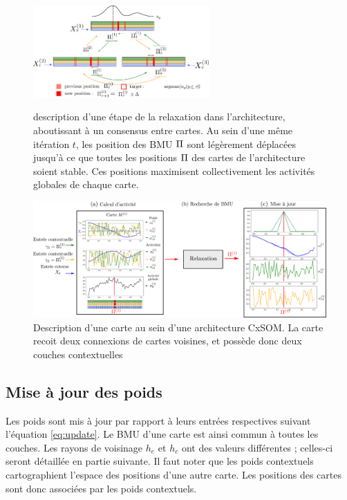 \begin{figure}
\centering
\includegraphics[width=0.6\textwidth]{relaxation.pdf}
\label{fig:relax}
\caption{description d'une étape de la relaxation dans l'architecture, aboutissant à un consensus entre cartes. Au sein d'une même itération $t$, les position des BMU $\Pi$ sont légèrement déplacées jusqu'à ce que toutes les positions $\Pi$ des cartes de l'architecture soient stable. Ces positions maximisent collectivement les activités globales de chaque carte. }
\end{figure}

\begin{figure}
\centering
\includegraphics[width=\textwidth]{map_2layers.pdf}
\caption{Description d'une carte au sein d'une architecture CxSOM. La carte recoit deux connexions de cartes voisines, et possède donc deux couches contextuelles}
\label{fig:one_map}
\end{figure}

\subsection{Mise à jour des poids}

Les poids sont mis à jour par rapport à leurs entrées respectives suivant l'équation \ref{eq:update}. Le BMU d'une carte est ainsi commun à toutes les couches. Les rayons de voisinage $h_e$ et $h_c$ ont des valeurs différentes ; celles-ci seront détaillée en partie suivante. 
Il faut noter que les poids contextuels cartographient l'espace des positions d'une autre carte. Les positions des cartes sont donc associées par les poids contextuels.

